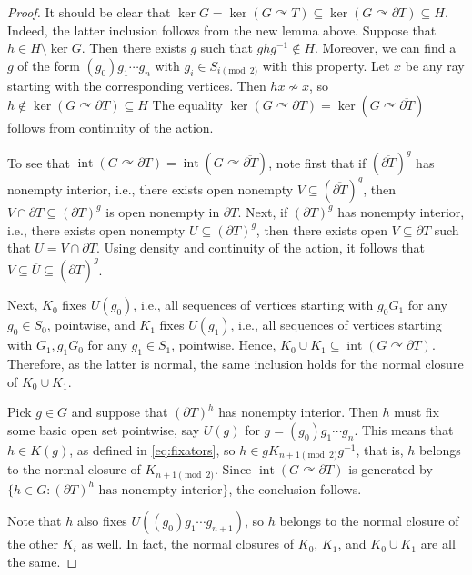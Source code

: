 \documentclass[a4paper]{amsart}
\theoremstyle{plain}
\theoremstyle{definition}
\theoremstyle{remark}
\numberwithin{theorem}{section}
\begin{document}
\begin{proof}
It should be clear that $\ker G=\ker(G\curvearrowright T)\subseteq\ker(G\curvearrowright \partial T)\subseteq H$.
Indeed, the latter inclusion follows from the new lemma above.
Suppose that $h\in H\setminus \ker G$.
Then there exists $g$ such that $ghg^{-1}\notin H$.
Moreover, we can find a $g$ of the form $(g_0)g_1\dotsm g_n$ with $g_i\in S_{i\pmod 2}$ with this property.
Let $x$ be any ray starting with the corresponding vertices.
Then $hx\not\sim x$, so $h\notin\ker(G\curvearrowright \partial T)\subseteq H$
The equality $\ker(G\curvearrowright\partial T)=\ker(G\curvearrowright\overline{\partial T})$ follows from continuity of the action.

To see that $\operatorname{int}(G\curvearrowright\partial T)=\operatorname{int}(G\curvearrowright\overline{\partial T})$, note first that if 
$(\overline{\partial T})^g$ has nonempty interior, i.e., there exists open nonempty $V\subseteq(\overline{\partial T})^g$,
then $V\cap\partial T\subseteq(\partial T)^g$ is open nonempty in $\partial T$.
Next, if $(\partial T)^g$ has nonempty interior, i.e., there exists open nonempty $U\subseteq(\partial T)^g$, then there exists open $V\subseteq\overline{\partial T}$ such that $U=V\cap\partial T$.
Using density and continuity of the action, it follows that $V\subseteq\overline{U}\subseteq(\overline{\partial T})^g$.

Next, $K_0$ fixes $U(g_0)$, i.e., all sequences of vertices starting with $g_0G_1$ for any $g_0\in S_0$, pointwise,
and $K_1$ fixes $U(g_1)$, i.e., all sequences of vertices starting with $G_1,g_1G_0$ for any $g_1\in S_1$, pointwise.
Hence, $K_0 \cup K_1 \subseteq \operatorname{int}(G\curvearrowright \partial T)$.
Therefore, as the latter is normal, the same inclusion holds for the normal closure of $K_0 \cup K_1$.

Pick $g\in G$ and suppose that $(\partial T)^h$ has nonempty interior.
Then $h$ must fix some basic open set pointwise, say $U(g)$ for $g=(g_0)g_1\dotsm g_n$.
This means that $h\in K(g)$, as defined in \eqref{eq:fixators}, so $h\in gK_{n+1\pmod 2}g^{-1}$,
that is, $h$ belongs to the normal closure of $K_{n+1\pmod 2}$.
Since $\operatorname{int}(G\curvearrowright \partial T)$ is generated by $\{h\in G:(\partial T)^h\text{ has nonempty interior}\}$,
the conclusion follows.

Note that $h$ also fixes $U((g_0)g_1\dotsm g_{n+1})$, so $h$ belongs to the normal closure of the other $K_i$ as well.
In fact, the normal closures of $K_0$, $K_1$, and $K_0 \cup K_1$ are all the same.
\end{proof}
\end{document}
